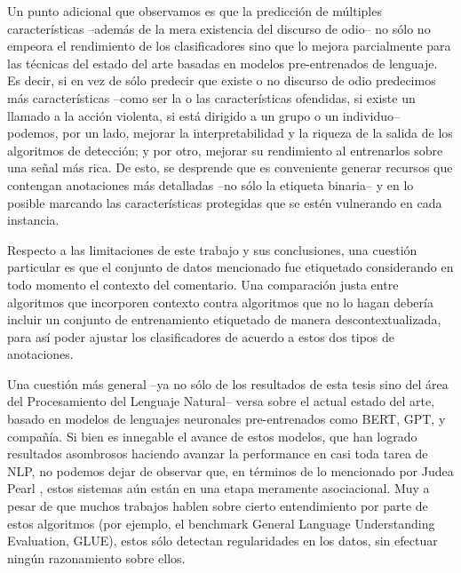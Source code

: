 Un punto adicional que observamos es que la predicción de múltiples características --además de la mera existencia del discurso de odio-- no sólo no empeora el rendimiento de los clasificadores sino que lo mejora parcialmente para las técnicas del estado del arte basadas en modelos pre-entrenados de lenguaje. Es decir, si en vez de sólo predecir que existe o no discurso de odio predecimos más características --como ser la o las características ofendidas, si existe un llamado a la acción violenta, si está dirigido a un grupo o un individuo-- podemos, por un lado, mejorar la interpretabilidad y la riqueza de la salida de los algoritmos de detección; y por otro, mejorar su rendimiento al entrenarlos sobre una señal más rica. De esto, se desprende que es conveniente generar recursos que contengan anotaciones más detalladas --no sólo la etiqueta binaria-- y en lo posible marcando las características protegidas que se estén vulnerando en cada instancia.


Respecto a las limitaciones de este trabajo y sus conclusiones, una cuestión particular es que el conjunto de datos mencionado fue etiquetado considerando en todo momento el contexto del comentario. Una comparación justa entre algoritmos que incorporen contexto contra algoritmos que no lo hagan debería incluir un conjunto de entrenamiento etiquetado de manera descontextualizada, para así poder ajustar los clasificadores de acuerdo a estos dos tipos de anotaciones.

Una cuestión más general --ya no sólo de los resultados de esta tesis sino del área del Procesamiento del Lenguaje Natural-- versa sobre el actual estado del arte, basado en modelos de lenguajes neuronales pre-entrenados como BERT, GPT, y compañía. Si bien es innegable el avance de estos modelos, que han logrado resultados asombrosos haciendo avanzar la performance en casi toda tarea de NLP, no podemos dejar de observar que, en términos de lo mencionado por Judea Pearl \cite{pearl2018book}, estos sistemas aún están en una etapa meramente asociacional. Muy a pesar de que muchos trabajos hablen sobre cierto entendimiento por parte de estos algoritmos (por ejemplo, el benchmark General Language Understanding Evaluation, GLUE), estos sólo detectan regularidades en los datos, sin efectuar ningún razonamiento sobre ellos.


